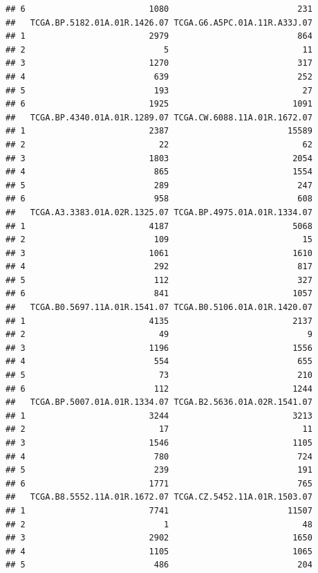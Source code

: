 \documentclass[
]{article}
\begin{document}
\begin{verbatim}
## 6                         1080                          231
##   TCGA.BP.5182.01A.01R.1426.07 TCGA.G6.A5PC.01A.11R.A33J.07
## 1                         2979                          864
## 2                            5                           11
## 3                         1270                          317
## 4                          639                          252
## 5                          193                           27
## 6                         1925                         1091
##   TCGA.BP.4340.01A.01R.1289.07 TCGA.CW.6088.11A.01R.1672.07
## 1                         2387                        15589
## 2                           22                           62
## 3                         1803                         2054
## 4                          865                         1554
## 5                          289                          247
## 6                          958                          608
##   TCGA.A3.3383.01A.02R.1325.07 TCGA.BP.4975.01A.01R.1334.07
## 1                         4187                         5068
## 2                          109                           15
## 3                         1061                         1610
## 4                          292                          817
## 5                          112                          327
## 6                          841                         1057
##   TCGA.B0.5697.11A.01R.1541.07 TCGA.B0.5106.01A.01R.1420.07
## 1                         4135                         2137
## 2                           49                            9
## 3                         1196                         1556
## 4                          554                          655
## 5                           73                          210
## 6                          112                         1244
##   TCGA.BP.5007.01A.01R.1334.07 TCGA.B2.5636.01A.02R.1541.07
## 1                         3244                         3213
## 2                           17                           11
## 3                         1546                         1105
## 4                          780                          724
## 5                          239                          191
## 6                         1771                          765
##   TCGA.B8.5552.11A.01R.1672.07 TCGA.CZ.5452.11A.01R.1503.07
## 1                         7741                        11507
## 2                            1                           48
## 3                         2902                         1650
## 4                         1105                         1065
## 5                          486                          204

\end{verbatim}
\end{document}
